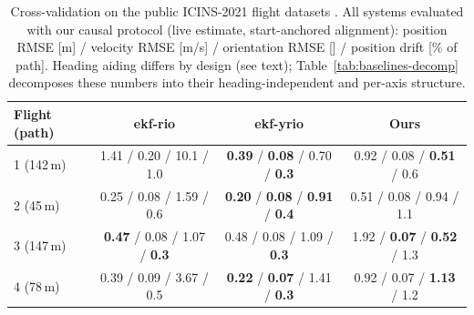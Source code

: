 \documentclass[conference]{IEEEtran}
\begin{document}
\begin{table}[t]
\caption{Cross-validation on the public ICINS-2021 flight datasets
\cite{doer2021yrio}.  All systems evaluated with our causal protocol
(live estimate, start-anchored alignment): position RMSE [m] /
velocity RMSE [m/s] / orientation RMSE [\degree] / position drift
[\% of path].  Heading aiding differs by design (see text);
Table~\ref{tab:baselines-decomp} decomposes these numbers into their
heading-independent and per-axis structure.}
\label{tab:baselines}
\centering
\footnotesize
\setlength{\tabcolsep}{3.5pt}
\begin{tabular}{lccc}
\toprule
Flight (path) & ekf-rio & ekf-yrio & Ours \\
\midrule
1 (142\,m) & 1.41 / 0.20 / 10.1 / 1.0 & \textbf{0.39} / \textbf{0.08} / 0.70 / \textbf{0.3} & 0.92 / 0.08 / \textbf{0.51} / 0.6 \\
2 (45\,m)  & 0.25 / 0.08 / 1.59 / 0.6 & \textbf{0.20} / \textbf{0.08} / \textbf{0.91} / \textbf{0.4} & 0.51 / 0.08 / 0.94 / 1.1 \\
3 (147\,m) & \textbf{0.47} / 0.08 / 1.07 / \textbf{0.3} & 0.48 / 0.08 / 1.09 / \textbf{0.3} & 1.92 / \textbf{0.07} / \textbf{0.52} / 1.3 \\
4 (78\,m)  & 0.39 / 0.09 / 3.67 / 0.5 & \textbf{0.22} / \textbf{0.07} / 1.41 / \textbf{0.3} & 0.92 / 0.07 / \textbf{1.13} / 1.2 \\
\bottomrule
\end{tabular}
\end{table}
\end{document}
